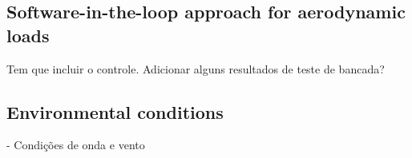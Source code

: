 \subsection{Software-in-the-loop approach for aerodynamic loads}
Tem que incluir o controle. Adicionar alguns resultados de teste de bancada?



\subsection{Environmental conditions} \label{sec:description_experiment:envir}
- Condições de onda e vento